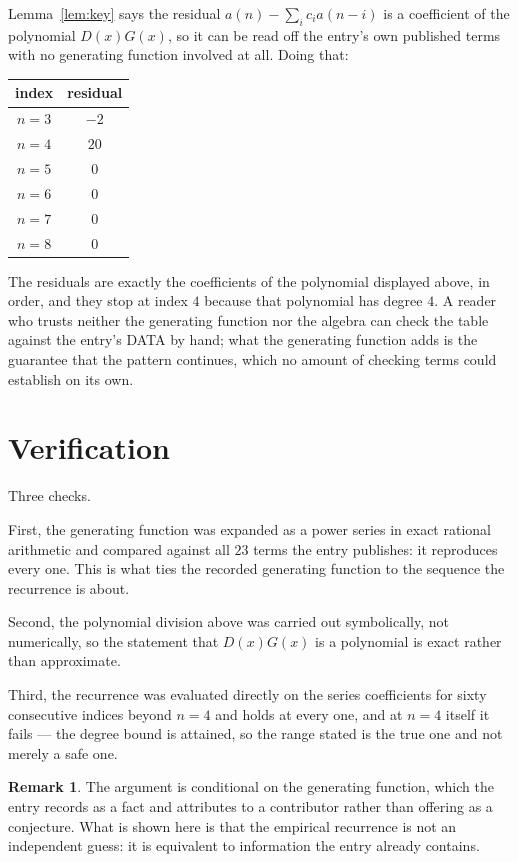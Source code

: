 \documentclass[11pt,a4paper]{article}
\theoremstyle{plain}
\theoremstyle{definition}
\newtheorem{remark}[theorem]{Remark}
\begin{document}
Lemma~\ref{lem:key} says the residual $a(n)-\sum_ic_ia(n-i)$ is a coefficient of the
polynomial $D(x)G(x)$, so it can be read off the entry's own published terms with no
generating function involved at all. Doing that:
\begin{center}
\begin{tabular}{cc}
index & residual \\ \hline
$n=3$ & $-2$ \\
$n=4$ & $20$ \\
$n=5$ & $0$ \\
$n=6$ & $0$ \\
$n=7$ & $0$ \\
$n=8$ & $0$
\end{tabular}
\end{center}
The residuals are exactly the coefficients of the polynomial displayed above, in order, and
they stop at index $4$ because that polynomial has degree $4$. A reader who trusts
neither the generating function nor the algebra can check the table against the entry's DATA
by hand; what the generating function adds is the guarantee that the pattern continues, which
no amount of checking terms could establish on its own.

\section{Verification}

Three checks.

First, the generating function was expanded as a power series in exact rational arithmetic and
compared against all $23$ terms the entry publishes: it reproduces every one. This is
what ties the recorded generating function to the sequence the recurrence is about.

Second, the polynomial division above was carried out symbolically, not numerically, so the
statement that $D(x)G(x)$ is a polynomial is exact rather than approximate.

Third, the recurrence was evaluated directly on the series coefficients for sixty consecutive
indices beyond $n=4$ and holds at every one, and at $n=4$ itself it fails --- the
degree bound is attained, so the range stated is the true one and not merely a safe one.

\begin{remark}
The argument is conditional on the generating function, which the entry records as a fact and
attributes to a contributor rather than offering as a conjecture. What is shown here is that
the empirical recurrence is not an independent guess: it is equivalent to information the
entry already contains.
\end{remark}
\end{document}
